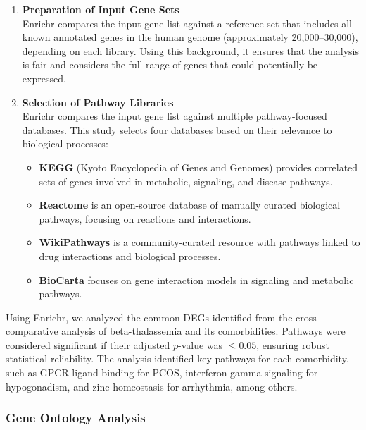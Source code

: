 \begin{enumerate}
    \item \textbf{Preparation of Input Gene Sets} \\
          Enrichr compares the input gene list against a reference set that includes all known annotated genes in the human genome (approximately 20,000--30,000), depending on each library. Using this background, it ensures that the analysis is fair and considers the full range of genes that could potentially be expressed.
    \item \textbf{Selection of Pathway Libraries} \\
          Enrichr compares the input gene list against multiple pathway-focused databases. This study selects four databases based on their relevance to biological processes:
          \begin{itemize}
              \item \textbf{KEGG} (Kyoto Encyclopedia of Genes and Genomes) provides correlated sets of genes involved in metabolic, signaling, and disease pathways.
              \item \textbf{Reactome} is an open-source database of manually curated biological pathways, focusing on reactions and interactions.
              \item \textbf{WikiPathways} is a community-curated resource with pathways linked to drug interactions and biological processes.
              \item \textbf{BioCarta} focuses on gene interaction models in signaling and metabolic pathways.
          \end{itemize}
\end{enumerate}

Using Enrichr, we analyzed the common DEGs identified from the cross-comparative analysis of beta-thalassemia and its comorbidities. Pathways were considered significant if their adjusted $p$-value was $\leq 0.05$, ensuring robust statistical reliability. The analysis identified key pathways for each comorbidity, such as GPCR ligand binding for PCOS, interferon gamma signaling for hypogonadism, and zinc homeostasis for arrhythmia, among others.

\vspace*{-\parskip} %
\subsubsection{Gene Ontology Analysis}
\label{sec:sec3_4_5}

